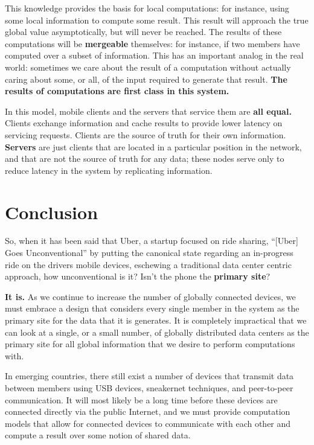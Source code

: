 \documentclass[english]{article}
\begin{document}
This knowledge provides the basis for local computations: for instance, using some local information to compute some result.  This result will approach the true global value asymptotically, but will never be reached.  The results of these computations will be \textbf{mergeable} themselves: for instance, if two members have computed over a subset of information.  This has an important analog in the real world: sometimes we care about the result of a computation without actually caring about some, or all, of the input required to generate that result.  \textbf{The results of computations are first class in this system.}

In this model, mobile clients and the servers that service them are \textbf{all equal.}  Clients exchange information and cache results to provide lower latency on servicing requests.  Clients are the source of truth for their own information. \textbf{Servers} are just clients that are located in a particular position in the network, and that are not the source of truth for any data; these nodes serve only to reduce latency in the system by replicating information.

\section{Conclusion}
So, when it has been said that Uber, a startup focused on ride sharing, ``[Uber] Goes Unconventional'' \cite{uber} by putting the canonical state regarding an in-progress ride on the drivers mobile devices, eschewing a traditional data center centric approach, how unconventional is it?  Isn't the phone the \textbf{primary site}?

\textbf{It is.}  As we continue to increase the number of globally connected devices, we must embrace a design that considers every single member in the system as the primary site for the data that it is generates.  It is completely impractical that we can look at a single, or a small number, of globally distributed data centers as the primary site for all global information that we desire to perform computations with.

In emerging countries, there still exist a number of devices that transmit data between members using USB devices, sneakernet techniques, and peer-to-peer communication.  It will most likely be a long time before these devices are connected directly via the public Internet, and we must provide computation models that allow for connected devices to communicate with each other and compute a result over some notion of shared data.
\end{document}
